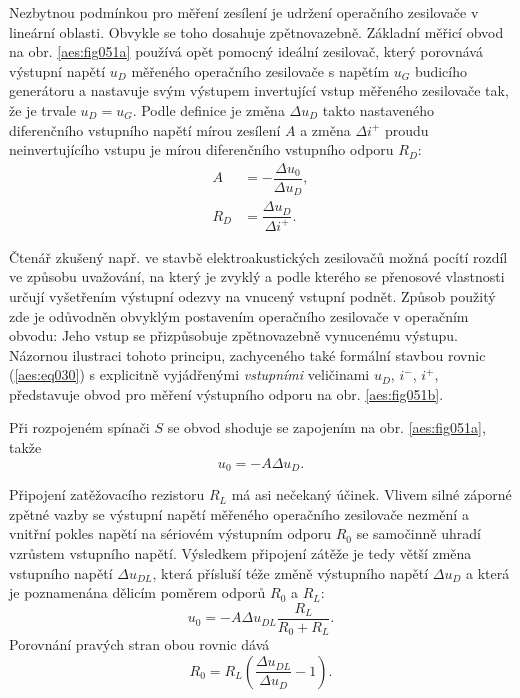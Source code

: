         Nezbytnou podmínkou pro měření zesílení je udržení operačního zesilovače v lineární oblasti.
        Obvykle se toho dosahuje zpětnovazebně. Základní měřicí obvod na obr. \ref{aes:fig051a}
        používá opět pomocný ideální zesilovač, který porovnává výstupní napětí \(u_D\) měřeného
        operačního zesilovače s napětím \(u_G\) budicího generátoru a nastavuje svým výstupem
        invertující vstup měřeného zesilovače tak, že je trvale \(u_D = u_G\). Podle definice je
        změna \(\Delta u_D\) takto nastaveného diferenčního vstupního napětí mírou zesílení \(A\) a
        změna \(\Delta i^+\) proudu neinvertujícího vstupu je mírou diferenčního vstupního odporu
        \(R_D\):
        \begin{subequations}\label{aes:eq42}
          \begin{align}
            A   &= - \dfrac{\Delta u_0}{\Delta u_D},                      \label{aes:eq42a} \\
            R_D &=   \dfrac{\Delta u_D}{\Delta i^+}.                      \label{aes:eq42b} 
          \end{align}
        \end{subequations}

        Čtenář zkušený např. ve stavbě elektroakustických zesilovačů možná pocítí rozdíl ve způsobu
        uvažování, na který je zvyklý a podle kterého se přenosové vlastnosti určují vyšetřením
        výstupní odezvy na vnucený vstupní podnět. Způsob použitý zde je odůvodněn obvyklým
        postavením operačního zesilovače v operačním obvodu: Jeho vstup se přizpůsobuje
        zpětnovazebně vynucenému výstupu. Názornou ilustraci tohoto principu, zachyceného také
        formální stavbou rovnic (\ref{aes:eq030}) s explicitně vyjádřenými \emph{vstupními}
        veličinami \(u_D\), \(i^-\), \(i^+\), představuje obvod pro měření výstupního odporu na obr.
        \ref{aes:fig051b}.

        Při rozpojeném spínači \(S\) se obvod shoduje se zapojením na obr. \ref{aes:fig051a}, takže
        \begin{equation*}
          u_0 = - A\Delta u_D.
        \end{equation*}

        Připojení zatěžovacího rezistoru \(R_L\) má asi nečekaný účinek. Vlivem silné záporné zpětné
        vazby se výstupní napětí měřeného operačního zesilovače nezmění a vnitřní pokles napětí na
        sériovém výstupním odporu \(R_0\) se samočinně uhradí vzrůstem vstupního napětí. Výsledkem
        připojení zátěže je tedy větší změna vstupního napětí \(\Delta u_{DL}\), která přísluší téže
        změně výstupního napětí \(\Delta u_D\) a která je poznamenána dělicím poměrem odporů \(R_0\)
        a \(R_L\):
        \begin{equation*}
          u_0 = - A\Delta u_{DL}\dfrac{R_L}{R_0 + R_L}.
        \end{equation*}
        Porovnání pravých stran obou rovnic dává
        \begin{equation}\label{aes:eq091}
          R_0 = R_L\left(\dfrac{\Delta u_{DL}}{\Delta u_D} -1\right).
        \end{equation}

